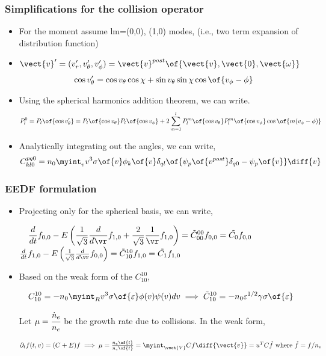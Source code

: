 \begin{frame}
	\frametitle{Simplifications for the collision operator}
	\begin{itemize}
		\item For the moment assume lm=(0,0), (1,0) modes, (i.e., two term expansion of distribution function)
		\item $\vect{v}^{\prime} = (v_r^\prime, v_\theta^\prime, v_\phi^\prime) =\vect{v}^{post}\of{\vect{v},\vect{0},\vect{\omega}}$
		\begin{align*}
			\cos v_\theta^\prime = \cos v_\theta \cos\chi + \sin v_\theta \sin \chi \cos\of{v_\phi-\phi}
		\end{align*}
		\item Using the spherical harmonics addition theorem, we can write. 
		\begin{align*}
			P_l^{0} = P_l\of{\cos v_\theta^\prime} =  P_l\of{\cos v_\theta} P_l\of{\cos v_\phi} + 2\sum_{m=1}^{l} P_l^{m}\of{\cos v_\theta} P_l^{m}\of{\cos v_\phi} \cos \of{ m (v_\phi-\phi)}
		\end{align*}
		\item Analytically integrating out the angles, we can write,
		\begin{align*}
			C^{pq0}_{kl0}  = n_0 \myint_{v} v^3 \sigma\of{v} \phi_k\of{v} \delta_{ql} \of{\psi_p\of{v^{post}}\delta_{q0} - \psi_p\of{v}} \diff{v}  
		\end{align*}
	\end{itemize}
\end{frame}

\begin{frame}
	\frametitle{EEDF formulation}
	\begin{itemize}
		\item Projecting only for the spherical basis, we can write, 
		\begin{center}
		$
		\displaystyle
		\quad
		\frac{d}{dt} f_{0,0} - E 
		\left( \frac{1}{\sqrt{3}} \frac{d}{d\vr} f_{1,0} 
		+  \frac{2}{\sqrt{3}} \frac{1}{\vr} f_{1,0} \right) = \tilde{C}^{00}_{00} f_{0,0} = \tilde{C_0} f_{0,0}
		$
		$\frac{d}{dt} f_{1,0} - E 
		\left( \frac{1}{\sqrt{3}} \frac{d}{d\vr} f_{0,0} \right) =  \tilde{C}^{10}_{10} f_{1,0} = \tilde{C_1} f_{1,0}
		$
		\end{center}
		\item Based on the weak form of the $C^{10}_{10}$, 
		\begin{center}
			$
			\displaystyle
			\quad
			C^{10}_{10} = -n_0 \myint_{R} v^3 \sigma\of{\varepsilon} \phi(v) \psi(v) dv \implies  \tilde{C}^{10}_{10} = -n_0 \varepsilon^{1/2} \gamma \sigma\of{\varepsilon} $
		\end{center} Let $\mu = \cfrac{\dot{n}_e}{n_e}$ be the growth rate due to collisions. In the weak form, 
		\begin{center}
			$\partial_t f(t,v) = (C + E)f \implies \mu = \frac{\dot{n}_e\of{t}}{n_e\of{t}} = \myint_{\vect{V}} C f \diff{\vect{v}} = u^T C \hat{f} \text{ where } \hat{f} = f/n_e$
		\end{center}
	\end{itemize}
\end{frame}

